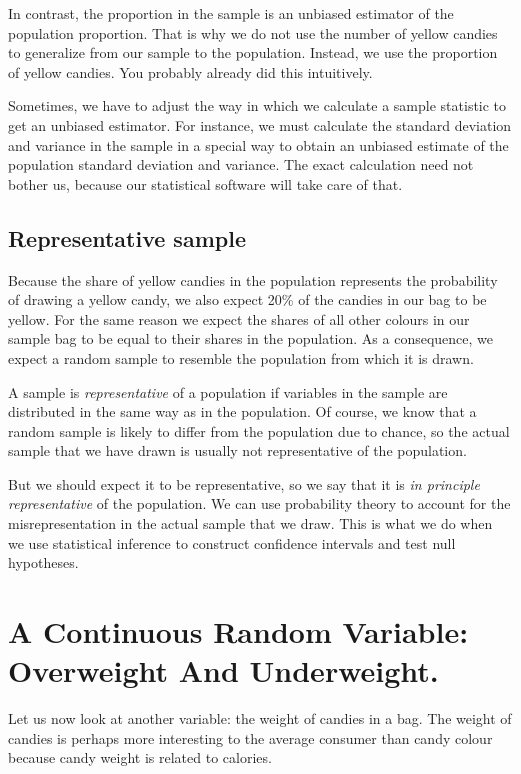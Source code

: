 \documentclass[a4paper]{book}
\theoremstyle{definition}
\theoremstyle{definition}
\theoremstyle{definition}
\theoremstyle{remark}
\begin{document}
In contrast, the proportion in the sample is an unbiased estimator of
the population proportion. That is why we do not use the number of
yellow candies to generalize from our sample to the population. Instead,
we use the proportion of yellow candies. You probably already did this
intuitively.

Sometimes, we have to adjust the way in which we calculate a sample
statistic to get an unbiased estimator. For instance, we must calculate
the standard deviation and variance in the sample in a special way to
obtain an unbiased estimate of the population standard deviation and
variance. The exact calculation need not bother us, because our
statistical software will take care of that.

\subsection{Representative sample}\label{representative}

Because the share of yellow candies in the population represents the
probability of drawing a yellow candy, we also expect 20\% of the
candies in our bag to be yellow. For the same reason we expect the
shares of all other colours in our sample bag to be equal to their
shares in the population. As a consequence, we expect a random sample to
resemble the population from which it is drawn.

A sample is \emph{representative} of a population if variables in the
sample are distributed in the same way as in the population. Of course,
we know that a random sample is likely to differ from the population due
to chance, so the actual sample that we have drawn is usually not
representative of the population.

But we should expect it to be representative, so we say that it is
\emph{in principle representative} of the population. We can use
probability theory to account for the misrepresentation in the actual
sample that we draw. This is what we do when we use statistical
inference to construct confidence intervals and test null hypotheses.

\section{A Continuous Random Variable: Overweight And
Underweight.}\label{cont-random-var}

Let us now look at another variable: the weight of candies in a bag. The
weight of candies is perhaps more interesting to the average consumer
than candy colour because candy weight is related to calories.
\end{document}
